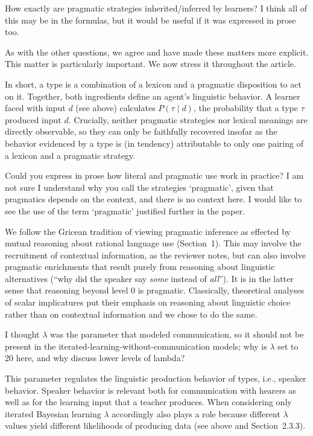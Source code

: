 \documentclass[12pt,a4paper]{article}
\begin{document}
\vspace{.5cm}
\begin{mdframed}[backgroundcolor=gray!25,linecolor=gray!25]
How exactly are pragmatic strategies inherited/inferred by learners?    I think all of this may be in the formulas, but it would be useful if it was expressed in prose too.
\end{mdframed}
As with the other questions, we agree and have made these matters more explicit. This matter is particularly important. We now stress it throughout the article.

In short, a type is a combination of a lexicon and a pragmatic disposition to act on it. Together, both ingredients define an agent's linguistic behavior. A learner faced with input $d$ (see above) calculates $P(\tau \mid d)$, the probability that a type $\tau$ produced input $d$. Crucially, neither pragmatic strategies nor lexical meanings are directly observable, so they can only be faithfully recovered insofar as the behavior evidenced by a type is (in tendency) attributable to only one pairing of a lexicon and a pragmatic strategy.

\vspace{.5cm}
\begin{mdframed}[backgroundcolor=gray!25,linecolor=gray!25]
Could you express in prose how literal and pragmatic use work in practice? I am not sure I understand why you call the strategies `pragmatic', given that pragmatics depends on the context, and there is no context here. I would like to see the use of the term `pragmatic' justified further in the paper.
\end{mdframed}
We follow the Gricean tradition of viewing pragmatic inference as effected by mutual reasoning about rational language use (Section~1). This may involve the recruitment of contextual information, as the reviewer notes, but can also involve pragmatic enrichments that result purely from reasoning about linguistic alternatives (``why did the speaker say {\em some} instead of {\em all}''). It is in the latter sense that reasoning beyond level $0$ is pragmatic. Classically, theoretical analyses of scalar implicatures put their emphasis on reasoning about linguistic choice rather than on contextual information \citep[e.g.,][]{horn:1972,gazdar:1979, franke:2009, GoodmanStuhlmuller2013:Knowledge-and-I} and we chose to do the same.

\vspace{.5cm}
\begin{mdframed}[backgroundcolor=gray!25,linecolor=gray!25]
I thought $\lambda$ was the parameter that modeled communication, so it should not be present in the iterated-learning-without-communication models; why is $\lambda$ set to 20 here, and why discuss lower levels of lambda? 
\end{mdframed}
This parameter regulates the linguistic production behavior of types, i.e., speaker behavior. Speaker behavior is relevant both for communication with hearers as well as for the learning input that a teacher produces. When considering only iterated Bayesian learning $\lambda$ accordingly also plays a role because different $\lambda$ values yield different likelihoods of producing data (see above and Section~2.3.3). 
\end{document}
